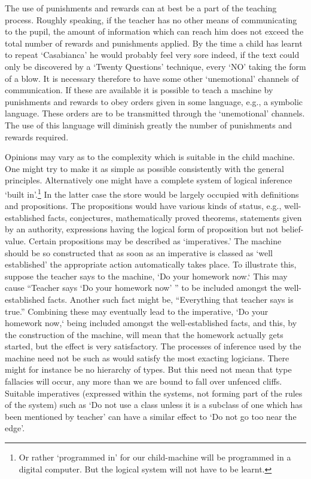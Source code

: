 \documentclass[10pt]{article} %
\begin{document}
The use of punishments and rewards can at best be a part of the teaching process. Roughly speaking, if the teacher has no other means of communicating to the pupil, the amount of information which can reach him does not exceed the total number of rewards and punishments applied. By the time a child has learnt to repeat `Casabianca' he would probably feel very sore indeed, if the text could only be discovered by a `Twenty Questions' technique, every `NO' taking the form of a blow. It is necessary therefore to have some other `unemotional' channels of communication. If these are available it is possible to teach a machine by punishments and rewards to obey orders given in some language, e.g., a symbolic language. These orders are to be transmitted through the `unemotional' channels. The use of this language will diminish greatly the number of punishments and rewards required.

Opinions may vary as to the complexity which is suitable in the child machine. One might try to make it as simple as possible consistently with the general principles. Alternatively one might have a complete system of logical inference `built in'.\footnote{\normalfont\tiny Or rather `programmed in' for our child-machine will be programmed in a digital computer. But the logical system will not have to be learnt.} In the latter case the store would be largely occupied with definitions and propositions. The propositions would have various kinds of status, e.g., well-established facts, conjectures, mathematically proved theorems, statements given by an authority, expressions having the logical form of proposition but not belief-value. Certain propositions may be described as `imperatives.' The machine should be so constructed that as soon as an imperative is classed as `well established' the appropriate action automatically takes place. To illustrate this, suppose the teacher says to the machine, `Do your homework now.` This may cause ``Teacher says `Do your homework now' '' to be included amongst the well-established facts. Another such fact might be, ``Everything that teacher says is true.'' Combining these may eventually lead to the imperative, `Do your homework now,` being included amongst the well-established facts, and this, by the construction of the machine, will mean that the homework actually gets started, but the effect is very satisfactory. The processes of inference used by the machine need not be such as would satisfy the most exacting logicians. There might for instance be no hierarchy of types. But this need not mean that type fallacies will occur, any more than we are bound to fall over unfenced cliffs. Suitable imperatives (expressed within the systems, not forming part of the rules of the system) such as `Do not use a class unless it is a subclass of one which has been mentioned by teacher' can have a similar effect to `Do not go too near the edge'.
\end{document}
